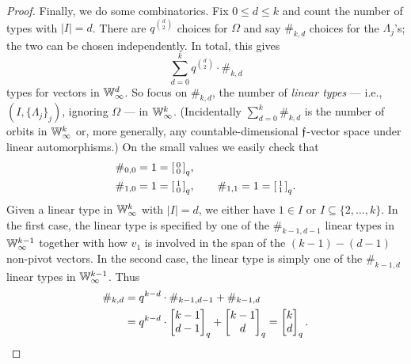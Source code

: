 \begin{proof}
    Finally, we do some combinatorics.
    Fix $0 \leq d \leq k$ and count the number of types with $|I| = d$.
    There are $q^{\binom{d}{2}}$ choices for $\Omega$ and say $\#_{k, d}$ choices for the $\Lambda_j$'s;
    the two can be chosen independently.
    In total, this gives
    \[ 
        \sum_{d=0}^k q^{\binom{d}{2}} \cdot \#_{k, d} 
    \]
    types for vectors in $\mathbb{W}_\infty^d$.
    So focus on $\#_{k, d}$, the number of \emph{linear types} --- i.e., $(I, \{\Lambda_j\}_j)$, ignoring $\Omega$ --- in $\mathbb{W}_\infty^k$.
    (Incidentally $\sum_{d=0}^k \#_{k, d}$ is the number of orbits in $\mathbb{W}_\infty^k$ or, more generally, any countable-dimensional $\mathfrak{f}$-vector space under linear automorphisms.)
    On the small values we easily check that \begin{align*}
        &\#_{0, 0} = 1 = \begin{bsmallmatrix}0 \\ 0\end{bsmallmatrix}_q, \\
        &\#_{1, 0} = 1 = \begin{bsmallmatrix}1 \\ 0\end{bsmallmatrix}_q,\qquad
        \#_{1, 1} = 1 = \begin{bsmallmatrix}1 \\ 1\end{bsmallmatrix}_q.
    \end{align*}
    Given a linear type in $\mathbb{W}_\infty^k$ with $\vert I \vert = d$, 
    we either have $1 \in I$ or $I \subseteq \{2, \ldots, k\}$.
    In the first case, the linear type is specified by one of the $\#_{k-1, d-1}$ linear types in $\mathbb{W}_\infty^{k-1}$
    together with how $v_1$ is involved in the span of the $(k - 1) - (d - 1)$ non-pivot vectors.
    In the second case, the linear type is simply one of the $\#_{k-1, d}$ linear types in $\mathbb{W}_\infty^{k-1}$.
    Thus 
    \begin{align*}
        \#_{k, d} 
        &= q^{k-d} \cdot \#_{k-1, d-1} + \#_{k-1, d} \\
        &= q^{k-d} \cdot \begin{bmatrix}k-1 \\ d-1\end{bmatrix}_q + \begin{bmatrix}k-1 \\ d\end{bmatrix}_q
        = \begin{bmatrix}k \\ d\end{bmatrix}_q.
        \qedhere
    \end{align*}
\end{proof}

